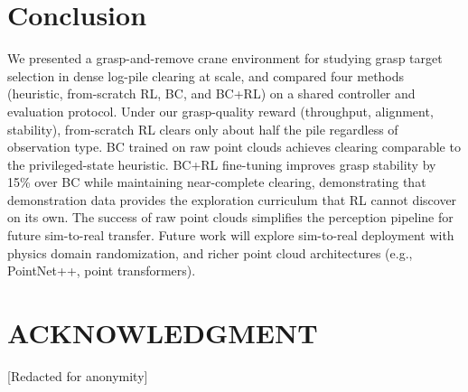 \documentclass[conference]{IEEEtran}
\begin{document}
\section{Conclusion}
We presented a grasp-and-remove crane environment for studying grasp target selection in dense log-pile clearing at scale, and compared four methods (heuristic, from-scratch RL, BC, and BC+RL) on a shared controller and evaluation protocol.
Under our grasp-quality reward (throughput, alignment, stability), from-scratch RL clears only about half the pile regardless of observation type.
BC trained on raw point clouds achieves clearing comparable to the privileged-state heuristic.
BC+RL fine-tuning improves grasp stability by 15\% over BC while maintaining near-complete clearing, demonstrating that demonstration data provides the exploration curriculum that RL cannot discover on its own.
The success of raw point clouds simplifies the perception pipeline for future sim-to-real transfer.
Future work will explore sim-to-real deployment with physics domain randomization, and richer point cloud architectures (e.g., PointNet++, point transformers).

\section*{ACKNOWLEDGMENT}
[Redacted for anonymity]



\end{document}
